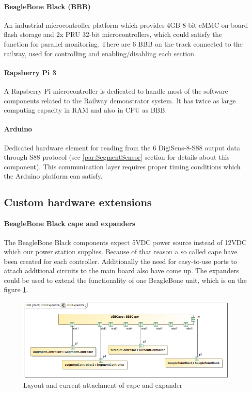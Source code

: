 \paragraph{BeagleBone Black (BBB)}
An industrial microcontroller platform which provides 4GB 8-bit eMMC on-board flash storage and 2x PRU 32-bit microcontrollers, which could satisfy the function for parallel monitoring. There are 6 BBB on the track connected to the railway, used for controlling and enabling/disabling each section.

\paragraph{Rapsberry Pi 3}
A Rapsberry Pi microcontroller is dedicated to handle most of the software components related to the Railway demonstrator system. It has twice as large computing capacity in RAM and also in CPU as BBB.

\paragraph{Arduino}
Dedicated hardware element for reading from the 6 DigiSens-8-S88 output data through S88 protocol (see \ref{par:SegmentSensor} section for details about this component). This communication layer requires proper timing conditions which the Arduino platform can satisfy.

\subsection{Custom hardware extensions}\label{section:CustomHW}
\paragraph{BeagleBone Black cape and expanders}\label{par:BBBcape}
The BeagleBone Black components expect 5VDC power source instead of 12VDC which our power station supplies. Because of that reason a so called cape have been created for each controller. Additionally the need for easy-to-use ports to attach additional circuits to the main board also have come up. The expanders could be used to extend the functionality of one BeagleBone unit, which is on the figure \ref{fig:capeSysml}. 

\begin{figure}[!h]
	\centering
	\includegraphics[width=150mm]{figures/modes3/BBBExpander.png}
	\caption{Layout and current attachment of cape and expander}
	\label{fig:capeSysml}
\end{figure}

